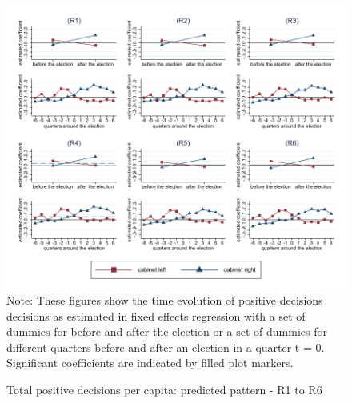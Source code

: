 \documentclass[11pt,a4paper]{scrartcl}
\begin{document}
\clearpage
\FloatBarrier
\begin{figure}[!ht]
	\caption{Total positive decisions per capita: predicted pattern - R1 to R6}
	\includegraphics[width=1\textwidth]{../results/decisions/log_totalpositive_pc_graphs_R1-R6.pdf}
	\scriptsize{Note: These figures show the time evolution of positive decisions decisions as estimated in fixed effects regression with a set of dummies for before and after the election or a set of dummies for different quarters before and after an election in a quarter t = 0. Significant coefficients are indicated by filled plot markers.}
\end{figure}

\clearpage
\FloatBarrier






\clearpage
\FloatBarrier

\end{document}
